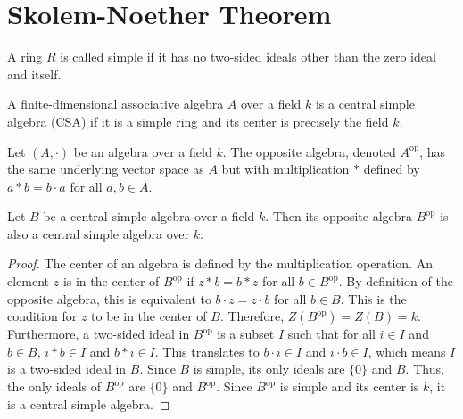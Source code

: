 \chapter{Skolem-Noether Theorem}

\begin{definition}
    \label{def:Simple_Ring}
    A ring $R$ is called simple if it has no two-sided ideals other than the zero ideal and itself.
\end{definition}

\begin{definition}
    \label{def:Central_Simple_Algebra}
    A finite-dimensional associative algebra $A$ over a field $k$ is a central simple algebra (CSA) if it is a simple ring and its center is precisely the field $k$.
\end{definition}

\begin{definition}
    \label{def:Opposite_Algebra}
    Let $(A, \cdot)$ be an algebra over a field $k$. The opposite algebra, denoted $A^{\text{op}}$, has the same underlying vector space as $A$ but with multiplication $*$ defined by $a * b = b \cdot a$ for all $a, b \in A$.
\end{definition}

\begin{lemma}
    \label{lem:Opposite_of_CSA_is_CSA}
    Let $B$ be a central simple algebra over a field $k$. Then its opposite algebra $B^{\text{op}}$ is also a central simple algebra over $k$.
\end{lemma}

\begin{proof}
    The center of an algebra is defined by the multiplication operation. An element $z$ is in the center of $B^{\text{op}}$ if $z * b = b * z$ for all $b \in B^{\text{op}}$. By definition of the opposite algebra, this is equivalent to $b \cdot z = z \cdot b$ for all $b \in B$. This is the condition for $z$ to be in the center of $B$. Therefore, $Z(B^{\text{op}}) = Z(B) = k$.
    Furthermore, a two-sided ideal in $B^{\text{op}}$ is a subset $I$ such that for all $i \in I$ and $b \in B$, $i*b \in I$ and $b*i \in I$. This translates to $b \cdot i \in I$ and $i \cdot b \in I$, which means $I$ is a two-sided ideal in $B$. Since $B$ is simple, its only ideals are $\{0\}$ and $B$. Thus, the only ideals of $B^{\text{op}}$ are $\{0\}$ and $B^{\text{op}}$.
    Since $B^{\text{op}}$ is simple and its center is $k$, it is a central simple algebra.
\end{proof}

